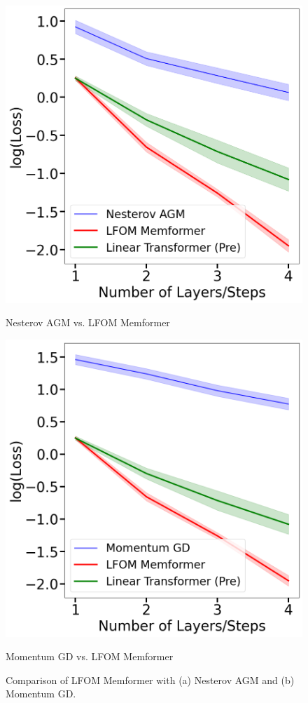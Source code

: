 \documentclass[11pt]{article}
\theoremstyle{plain}
\theoremstyle{definition}
\theoremstyle{remark}
\numberwithin{equation}{section}
\begin{document}
\begin{figure}[htbp]
  \centering
  \begin{minipage}[b]{0.45\textwidth}
    \centering
    \includegraphics[width=\textwidth]{Nesterov_AGM_Experiments.png}
    \caption{Nesterov AGM vs. LFOM Memformer}
    \label{fig:nag_vs_Memformer}
  \end{minipage}
  \hfill
  \begin{minipage}[b]{0.45\textwidth}
    \centering
    \includegraphics[width=\textwidth]{Momentum_GD_Experiment.png}
    \caption{Momentum GD vs. LFOM Memformer}
    \label{fig:mgd_vs_Memformer}
  \end{minipage}
  \caption{Comparison of LFOM Memformer with (a) Nesterov AGM and (b) Momentum GD.}
  \label{fig:comparison_figures}
\end{figure}
\end{document}
